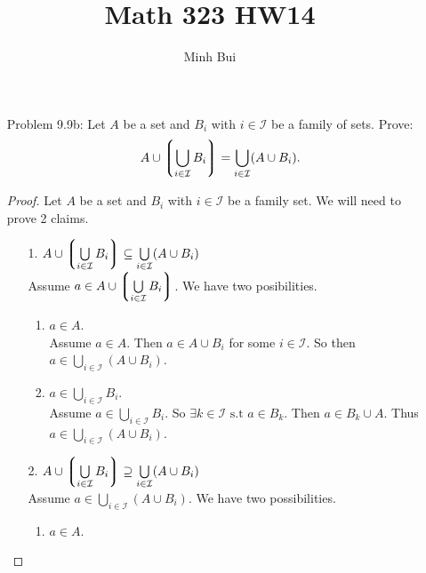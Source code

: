 \documentclass{article}
\author{Minh Bui}
\title{Math 323 HW14}
\theoremstyle{claim}
\theoremstyle{definition}
\begin{document}
\maketitle
\begin{enumerate}
    \item[Problem 9.9b:] Let $A$ be a set and $B_i$ with $i \in \mathcal{I}$ be a family of sets. Prove:
        \begin{equation*}
            A \cup \left \lgroup \bigcup\limits_{i \in \mathcal{I}} B_i \right \rgroup = \bigcup\limits_{i \in \mathcal{I}} (A \cup B_i).
        \end{equation*}
        \begin{proof}
            Let $A$ be a set and $B_i$ with $i \in \mathcal{I}$ be a family set. We will need to prove 2 claims.
            \begin{enumerate}
                \item[1.] $A \cup \left \lgroup \bigcup\limits_{i \in \mathcal{I}} B_i \right \rgroup \subseteq \bigcup\limits_{i \in \mathcal{I}} (A \cup B_i)$\\
                Assume $a \in A \cup \left \lgroup \bigcup\limits_{i \in \mathcal{I}} B_i \right \rgroup$. We have two posibilities.
                \begin{enumerate}
                    \item $a \in A$.\\
                        Assume $a \in A$. Then $a \in A \cup B_i$ for some $i \in \mathcal{I}$. So then $a \in \bigcup\limits_{i \in \mathcal{I}} (A \cup B_i)$.
                    \item $a \in \bigcup\limits_{i \in \mathcal{I}} B_i$.\\
                        Assume $a \in \bigcup\limits_{i \in \mathcal{I}} B_i$. So $\exists k \in \mathcal{I} \text{ s.t } a \in B_k$. Then $a \in B_k \cup A$. Thus $a \in \bigcup\limits_{i \in \mathcal{I}} (A \cup B_i)$.
                \end{enumerate}
                \item[2.] $A \cup \left \lgroup \bigcup\limits_{i \in \mathcal{I}} B_i \right \rgroup \supseteq \bigcup\limits_{i \in \mathcal{I}} (A \cup B_i)$\\
                    Assume $a \in \bigcup\limits_{i \in \mathcal{I}} (A \cup B_i)$. We have two possibilities.
                    \begin{enumerate}
                        \item $a \in A$.\\

\end{enumerate}
\end{enumerate}
\end{proof}
\end{enumerate}
\end{document}
